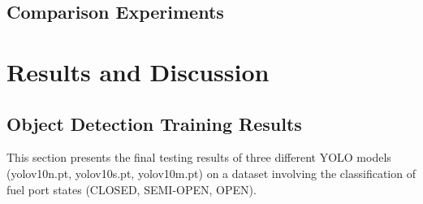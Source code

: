 \documentclass[12pt,oneside]{book} %
\begin{document}
\section{Comparison Experiments}

\chapter{Results and Discussion}

\section{Object Detection Training Results}

This section presents the final testing results of three different YOLO models
(yolov10n.pt, yolov10s.pt, yolov10m.pt) on a dataset involving the
classification of fuel port states (CLOSED, SEMI-OPEN, OPEN).
\end{document}
